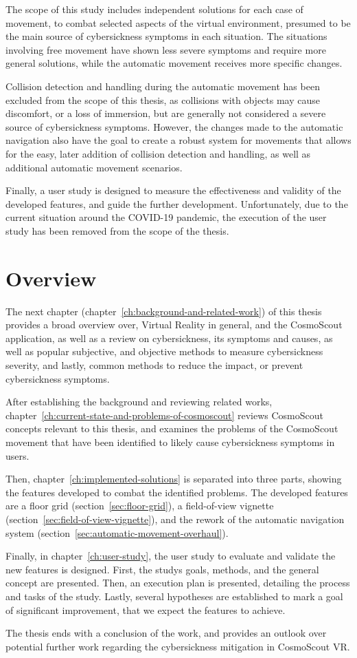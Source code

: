 The scope of this study includes independent solutions for each case of movement, to combat selected
aspects of the virtual environment, presumed to be the main source of cybersickness symptoms in each situation.
The situations involving free movement have shown less severe symptoms and require more general solutions, while the
automatic movement receives more specific changes.

Collision detection and handling during the automatic movement has been excluded from the scope of this thesis, as
collisions with objects may cause discomfort, or a loss of immersion, but are generally not considered a severe source
of cybersickness symptoms.
However, the changes made to the automatic navigation also have the goal to create a robust system for movements that
allows for the easy, later addition of collision detection and handling, as well as additional automatic movement
scenarios.

Finally, a user study is designed to measure the effectiveness and validity of the developed features, and guide the
further development.
Unfortunately, due to the current situation around the COVID-19 pandemic, the execution of the user study has been
removed from the scope of the thesis.


\section{Overview}\label{sec:overview}

The next chapter (chapter~\ref{ch:background-and-related-work}) of this thesis provides a broad overview over,
Virtual Reality in general, and the CosmoScout application, as well as a review on cybersickness, its symptoms and
causes, as well as popular subjective, and objective methods to measure cybersickness severity, and lastly, common
methods to reduce the impact, or prevent cybersickness symptoms.

After establishing the background and reviewing related works,
chapter~\ref{ch:current-state-and-problems-of-cosmoscout} reviews CosmoScout concepts relevant to this thesis, and
examines the problems of the CosmoScout movement that have been identified to likely cause cybersickness symptoms in
users.

Then, chapter~\ref{ch:implemented-solutions} is separated into three parts, showing the features developed to combat
the identified problems.
The developed features are a floor grid (section~\ref{sec:floor-grid}), a field-of-view vignette
(section~\ref{sec:field-of-view-vignette}), and the rework of the automatic navigation system
(section~\ref{sec:automatic-movement-overhaul}).

Finally, in chapter~\ref{ch:user-study}, the user study to evaluate and validate the new features is designed.
First, the studys goals, methods, and the general concept are presented.
Then, an execution plan is presented, detailing the process and tasks of the study.
Lastly, several hypotheses are established to mark a goal of significant improvement, that we expect the features to
achieve.

The thesis ends with a conclusion of the work, and provides an outlook over potential further work regarding the
cybersickness mitigation in CosmoScout VR\@.

